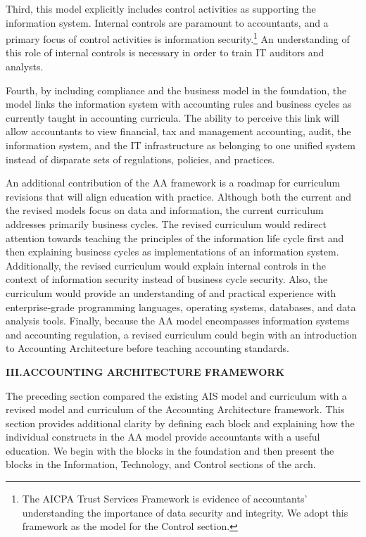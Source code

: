 \documentclass[12pt]{article}
\newcommand{\Section}[2]{\vspace{.2in}\centerline{\normalsize{}\textbf{#1\quad{}\MakeUppercase{#2}}}\nopagebreak{}\smallskip{}\indent{}}
\begin{document}
Third, this model explicitly includes control activities as supporting the information system. Internal controls are paramount to accountants, and a primary focus of control activities is information security.\footnote{The AICPA Trust Services Framework is evidence of accountants' understanding the importance of data security and integrity. We adopt this framework as the model for the Control section.} An understanding of this role of internal controls is necessary in order to train IT auditors and analysts.

Fourth, by including compliance and the business model in the foundation, the model links the information system with accounting rules and business cycles as currently taught in accounting curricula. The ability to perceive this link will allow accountants to view financial, tax and management accounting, audit, the information system, and the IT infrastructure as belonging to one unified system instead of disparate sets of regulations, policies, and practices.

An additional contribution of the AA framework is a roadmap for curriculum revisions that will align education with practice. Although both the current and the revised models focus on data and information, the current curriculum addresses primarily business cycles. The revised curriculum would redirect attention towards teaching the principles of the information life cycle first and then explaining business cycles as implementations of an information system. Additionally, the revised curriculum would explain internal controls in the context of information security instead of business cycle security. Also, the curriculum would provide an understanding of and practical experience with enterprise-grade programming languages, operating systems, databases, and data analysis tools. Finally, because the AA model encompasses information systems and accounting regulation, a revised curriculum could begin with an introduction to Accounting Architecture before teaching accounting standards. 

\Section{III.}{Accounting Architecture Framework}
The preceding section compared the existing AIS model and curriculum with a revised model and curriculum of the Accounting Architecture framework. This section provides additional clarity by defining each block and explaining how the individual constructs in the AA model provide accountants with a useful education. We begin with the blocks in the foundation and then present the blocks in the Information, Technology, and Control sections of the arch.
\end{document}
